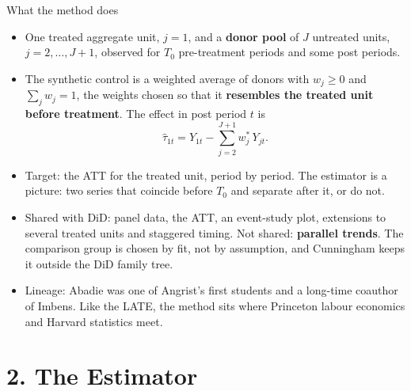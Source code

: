 \documentclass[
  11pt,
  ignorenonframetext,
  aspectratio=169,
]{beamer}
\providecommand{\tightlist}{%
  \setlength{\itemsep}{0pt}\setlength{\parskip}{0pt}}
\begin{document}
\begin{frame}{What the method does}
\protect{}\label{what-the-method-does}
\begin{itemize}
\tightlist
\item
  One treated aggregate unit, \(j = 1\), and a \textbf{donor pool} of
  \(J\) untreated units, \(j = 2, \dots, J+1\), observed for \(T_0\)
  pre-treatment periods and some post periods.
\item
  The synthetic control is a weighted average of donors with
  \(w_j \geq 0\) and \(\sum_j w_j = 1\), the weights chosen so that it
  \textbf{resembles the treated unit before treatment}. The effect in
  post period \(t\) is \[
  \hat\tau_{1t} = Y_{1t} - \sum_{j=2}^{J+1} w_j^{*}\, Y_{jt}.
  \]
\item
  Target: the ATT for the treated unit, period by period. The estimator
  is a picture: two series that coincide before \(T_0\) and separate
  after it, or do not.
\item
  Shared with DiD: panel data, the ATT, an event-study plot, extensions
  to several treated units and staggered timing. Not shared:
  \textbf{parallel trends}. The comparison group is chosen by fit, not
  by assumption, and Cunningham keeps it outside the DiD family tree.
\item
  Lineage: Abadie was one of Angrist's first students and a long-time
  coauthor of Imbens. Like the LATE, the method sits where Princeton
  labour economics and Harvard statistics meet.
\end{itemize}
\end{frame}

\section{2. The Estimator}\label{the-estimator}
\end{document}
